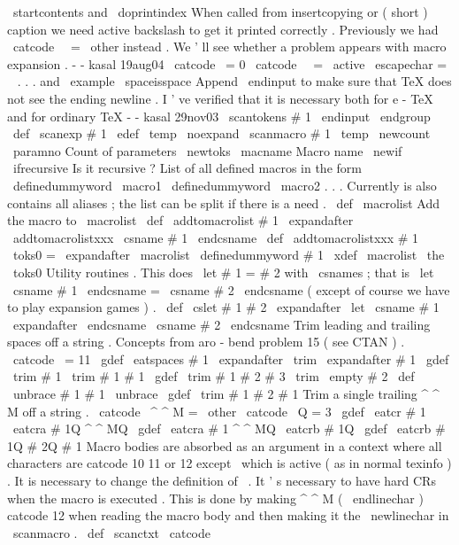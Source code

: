 {{{\
startcontents
and
\
doprintindex
%
When
called
from
insertcopying
or
(
short
)
caption
we
need
active
%
backslash
to
get
it
printed
correctly
.
Previously
we
had
%
\
catcode
\
\
=
\
other
instead
.
We
'
ll
see
whether
a
problem
appears
%
with
macro
expansion
.
-
-
kasal
19aug04
\
catcode
\
=
0
\
catcode
\
\
=
\
active
\
escapechar
=
\
%
.
.
.
and
\
example
\
spaceisspace
%
%
Append
\
endinput
to
make
sure
that
TeX
does
not
see
the
ending
newline
.
%
I
'
ve
verified
that
it
is
necessary
both
for
e
-
TeX
and
for
ordinary
TeX
%
-
-
kasal
29nov03
\
scantokens
{
#
1
\
endinput
}
%
\
endgroup
}
\
def
\
scanexp
#
1
{
%
\
edef
\
temp
{
\
noexpand
\
scanmacro
{
#
1
}
}
%
\
temp
}
\
newcount
\
paramno
%
Count
of
parameters
\
newtoks
\
macname
%
Macro
name
\
newif
\
ifrecursive
%
Is
it
recursive
?
%
List
of
all
defined
macros
in
the
form
%
\
definedummyword
\
macro1
\
definedummyword
\
macro2
.
.
.
%
Currently
is
also
contains
all
aliases
;
the
list
can
be
split
%
if
there
is
a
need
.
\
def
\
macrolist
{
}
%
Add
the
macro
to
\
macrolist
\
def
\
addtomacrolist
#
1
{
\
expandafter
\
addtomacrolistxxx
\
csname
#
1
\
endcsname
}
\
def
\
addtomacrolistxxx
#
1
{
%
\
toks0
=
\
expandafter
{
\
macrolist
\
definedummyword
#
1
}
%
\
xdef
\
macrolist
{
\
the
\
toks0
}
%
}
%
Utility
routines
.
%
This
does
\
let
#
1
=
#
2
with
\
csnames
;
that
is
%
\
let
\
csname
#
1
\
endcsname
=
\
csname
#
2
\
endcsname
%
(
except
of
course
we
have
to
play
expansion
games
)
.
%
\
def
\
cslet
#
1
#
2
{
%
\
expandafter
\
let
\
csname
#
1
\
expandafter
\
endcsname
\
csname
#
2
\
endcsname
}
%
Trim
leading
and
trailing
spaces
off
a
string
.
%
Concepts
from
aro
-
bend
problem
15
(
see
CTAN
)
.
{
\
catcode
\
=
11
\
gdef
\
eatspaces
#
1
{
\
expandafter
\
trim
\
expandafter
{
#
1
}
}
\
gdef
\
trim
#
1
{
\
trim
#
1
#
1
}
\
gdef
\
trim
#
1
#
2
#
3
{
\
trim
\
empty
#
2
}
\
def
\
unbrace
#
1
{
#
1
}
\
unbrace
{
\
gdef
\
trim
#
1
}
#
2
{
#
1
}
}
%
Trim
a
single
trailing
^
^
M
off
a
string
.
{
\
catcode
\
^
^
M
=
\
other
\
catcode
\
Q
=
3
%
\
gdef
\
eatcr
#
1
{
\
eatcra
#
1Q
^
^
MQ
}
%
\
gdef
\
eatcra
#
1
^
^
MQ
{
\
eatcrb
#
1Q
}
%
\
gdef
\
eatcrb
#
1Q
#
2Q
{
#
1
}
%
}
%
Macro
bodies
are
absorbed
as
an
argument
in
a
context
where
%
all
characters
are
catcode
10
11
or
12
except
\
which
is
active
%
(
as
in
normal
texinfo
)
.
It
is
necessary
to
change
the
definition
of
\
.
%
It
'
s
necessary
to
have
hard
CRs
when
the
macro
is
executed
.
This
is
%
done
by
making
^
^
M
(
\
endlinechar
)
catcode
12
when
reading
the
macro
%
body
and
then
making
it
the
\
newlinechar
in
\
scanmacro
.
\
def
\
scanctxt
{
%
\
catcode
}}}

